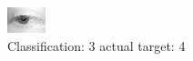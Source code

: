 \begin{figure}[h!]
\begin{center}
\includegraphics[width=0.60\columnwidth]{figures/ID2605_class_3_target_4.png}
\end{center}
\caption{ Classification: 3 actual target: 4}
\label{fig:ID2605_class_3_target_4}
\end{figure}

